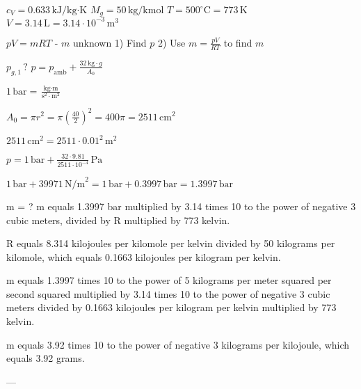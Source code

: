 \( c_V = 0.633 \, \text{kJ/kg·K} \)  
\( M_g = 50 \, \text{kg/kmol} \)  
\( T = 500^\circ \text{C} = 773 \, \text{K} \)  
\( V = 3.14 \, \text{L} = 3.14 \cdot 10^{-3} \, \text{m}^3 \)  

\( pV = mRT \)  
- \( m \) unknown  
1) Find \( p \)  
2) Use \( m = \frac{pV}{RT} \) to find \( m \)  

\( p_{g,1} \, ? \)  
\( p = p_{\text{amb}} + \frac{32 \, \text{kg} \cdot g}{A_0} \)  

\( 1 \, \text{bar} = \frac{\text{kg} \cdot \text{m}}{\text{s}^2 \cdot \text{m}^2} \)  

\( A_0 = \pi r^2 = \pi \left(\frac{40}{2}\right)^2 = 400 \pi = 2511 \, \text{cm}^2 \)  

\( 2511 \, \text{cm}^2 = 2511 \cdot 0.01^2 \, \text{m}^2 \)  

\( p = 1 \, \text{bar} + \frac{32 \cdot 9.81}{2511 \cdot 10^{-4}} \, \text{Pa} \)  

\( 1 \, \text{bar} + 39971 \, \text{N/m}^2 = 1 \, \text{bar} + 0.3997 \, \text{bar} = 1.3997 \, \text{bar} \)

m = ?  
m equals 1.3997 bar multiplied by 3.14 times 10 to the power of negative 3 cubic meters, divided by R multiplied by 773 kelvin.  

R equals 8.314 kilojoules per kilomole per kelvin divided by 50 kilograms per kilomole, which equals 0.1663 kilojoules per kilogram per kelvin.  

m equals 1.3997 times 10 to the power of 5 kilograms per meter squared per second squared multiplied by 3.14 times 10 to the power of negative 3 cubic meters divided by 0.1663 kilojoules per kilogram per kelvin multiplied by 773 kelvin.  

m equals 3.92 times 10 to the power of negative 3 kilograms per kilojoule, which equals 3.92 grams.  

---